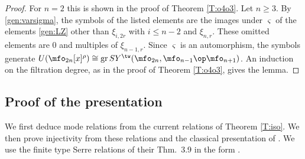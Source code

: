 \documentclass{amsart}
\numberwithin{equation}{section}
\theoremstyle{remark}
\DeclareMathOperator{\gr}{gr}
\renewcommand{\,}{\kern 0.1em} %
\begin{document}
\begin{proof}
%
For $n=2$ this is shown in the proof of Theorem \ref{T:o4o3}. Let $n\ge3$. By
\eqref{gen:varsigma}, the symbols of the listed elements are the images under $\varsigma$ of the
elements \eqref{gen:LZ} other than $\xi_{i,2r}$ with $i\le n-2$ and $\xi_{n,r}$. These omitted
elements are $0$ and multiples of $\xi_{n-1,r}$. Since $\varsigma$ is an automorphism, the symbols
generate $U(\mfo_{2n}[x]^\rho)\cong\gr SY^\tw(\mfo_{2n},\mfo_{n-1}\op\mfo_{n+1})$. An induction on
the filtration degree, as in the proof of Theorem \ref{T:o4o3}, gives the lemma.
%
\end{proof}


\subsection{Proof of the presentation} \label{sec:proof-iso}

We first deduce mode relations from the current relations of Theorem \ref{T:iso}. We then prove
injectivity from these relations and the classical presentation of \cite[Prop.~2.7]{LZ25}. We use the
finite type Serre relations of their Thm.~3.9 in the form \cite[Def.~2.10]{HL26}.
\end{document}
